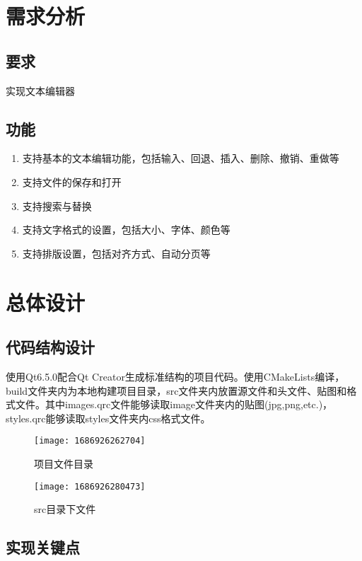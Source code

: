 \documentclass{./source/Report}
\date{\today}
\begin{document}
\makecover

\tableofcontents

\newpage

\section{需求分析}

\subsection{要求}
实现文本编辑器
\subsection{功能}
\begin{enumerate}
    \item 支持基本的文本编辑功能，包括输入、回退、插入、删除、撤销、重做等
    \item 支持文件的保存和打开
    \item 支持搜索与替换
    \item 支持文字格式的设置，包括大小、字体、颜色等
    \item 支持排版设置，包括对齐方式、自动分页等
\end{enumerate}

\section{总体设计}
\subsection{代码结构设计}
使用Qt6.5.0配合Qt Creator生成标准结构的项目代码。使用CMakeLists编译，build文件夹内为本地构建项目目录，src文件夹内放置源文件和头文件、贴图和格式文件。其中images.qrc文件能够读取image文件夹内的贴图(jpg,png,etc.)，styles.qrc能够读取styles文件夹内css格式文件。
\begin{figure}[!htbp]
    \begin{minipage}{0.45\textwidth}
        \centering
        \texttt{[image: 1686926262704]}
        \caption{项目文件目录}
    \end{minipage}
    \begin{minipage}{0.45\textwidth}
        \centering
        \texttt{[image: 1686926280473]}
        \caption{src目录下文件}
    \end{minipage}
\end{figure}
\subsection{实现关键点}
\end{document}
